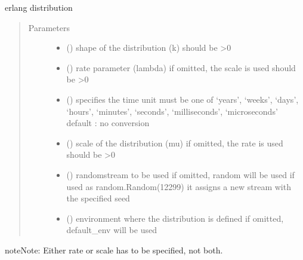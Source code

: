\documentclass[letterpaper,10pt,english]{sphinxmanual}
\begin{document}
\begin{fulllineitems}
\label{\detokenize{Reference:salabim.Erlang}}
erlang distribution
\begin{quote}\begin{description}
\item[{Parameters}] \leavevmode\begin{itemize}
\item {} 
 () \textendash{} shape of the distribution (k) 
should be \textgreater{}0

\item {} 
 () \textendash{} rate parameter (lambda) 
if omitted, the scale is used 
should be \textgreater{}0

\item {} 
 () \textendash{} specifies the time unit 
must be one of ‘years’, ‘weeks’, ‘days’, ‘hours’, ‘minutes’, ‘seconds’, ‘milliseconds’, ‘microseconds’ 
default : no conversion 

\item {} 
 () \textendash{} scale of the distribution (mu) 
if omitted, the rate is used 
should be \textgreater{}0

\item {} 
 () \textendash{} randomstream to be used 
if omitted, random will be used 
if used as random.Random(12299)
it assigns a new stream with the specified seed

\item {} 
 ({\hyperref[\detokenize{Reference:salabim.Environment}]{}}) \textendash{} environment where the distribution is defined 
if omitted, default\_env will be used

\end{itemize}

\end{description}\end{quote}

\begin{sphinxadmonition}{note}{Note:}
Either rate or scale has to be specified, not both.
\end{sphinxadmonition}


\end{fulllineitems}
\end{document}
